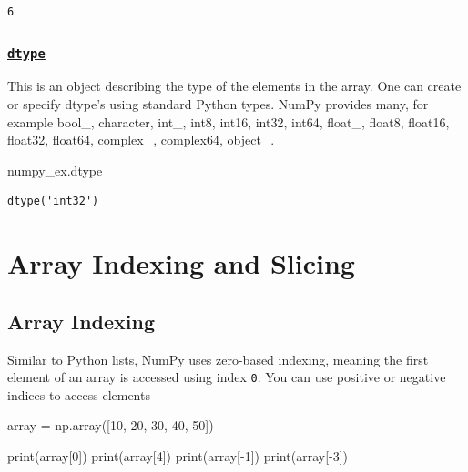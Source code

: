 \documentclass[
  letterpaper,
  DIV=11,
  numbers=noendperiod]{scrreprt}
\newenvironment{Shaded}{\begin{snugshade}}{\end{snugshade}}
\newcommand{\BuiltInTok}[1]{\textcolor[rgb]{0.00,0.23,0.31}{#1}}
\newcommand{\DecValTok}[1]{\textcolor[rgb]{0.68,0.00,0.00}{#1}}
\newcommand{\NormalTok}[1]{\textcolor[rgb]{0.00,0.23,0.31}{#1}}
\newcommand{\OperatorTok}[1]{\textcolor[rgb]{0.37,0.37,0.37}{#1}}
\begin{document}
\begin{verbatim}
6
\end{verbatim}

\hypertarget{dtype}{%
\subsubsection{\texorpdfstring{\href{https://numpy.org/doc/stable/reference/generated/numpy.ndarray.dtype.html}{\texttt{dtype}}}{dtype}}\label{dtype}}

This is an object describing the type of the elements in the array. One
can create or specify dtype's using standard Python types. NumPy
provides many, for example bool\_, character, int\_, int8, int16, int32,
int64, float\_, float8, float16, float32, float64, complex\_, complex64,
object\_.

\begin{Shaded}
\begin{Highlighting}[]
\NormalTok{numpy\_ex.dtype}
\end{Highlighting}
\end{Shaded}

\begin{verbatim}
dtype('int32')
\end{verbatim}

\hypertarget{array-indexing-and-slicing}{%
\section{Array Indexing and Slicing}\label{array-indexing-and-slicing}}

\hypertarget{array-indexing}{%
\subsection{Array Indexing}\label{array-indexing}}

Similar to Python lists, NumPy uses zero-based indexing, meaning the
first element of an array is accessed using index \texttt{0}. You can
use positive or negative indices to access elements

\begin{Shaded}
\begin{Highlighting}[]
\NormalTok{array }\OperatorTok{=}\NormalTok{ np.array([}\DecValTok{10}\NormalTok{, }\DecValTok{20}\NormalTok{, }\DecValTok{30}\NormalTok{, }\DecValTok{40}\NormalTok{, }\DecValTok{50}\NormalTok{])}

\BuiltInTok{print}\NormalTok{(array[}\DecValTok{0}\NormalTok{])  }
\BuiltInTok{print}\NormalTok{(array[}\DecValTok{4}\NormalTok{]) }
\BuiltInTok{print}\NormalTok{(array[}\OperatorTok{{-}}\DecValTok{1}\NormalTok{])  }
\BuiltInTok{print}\NormalTok{(array[}\OperatorTok{{-}}\DecValTok{3}\NormalTok{])  }
\end{Highlighting}
\end{Shaded}
\end{document}
